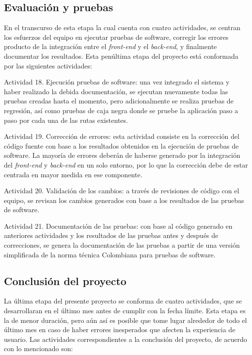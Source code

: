 \subsection{Evaluación y pruebas}
En el transcurso de esta etapa la cual cuenta con cuatro actividades, se centran los esfuerzos del equipo en ejecutar pruebas de software, corregir los errores producto de la integración entre el \textit{front-end} y el \textit{back-end}, y finalmente documentar los resultados. Esta penúltima etapa del proyecto está conformada por las siguientes actividades:

\begin{APAitemize}
    \item Actividad 18. Ejecución pruebas de software: una vez integrado el sistema y haber realizado la debida documentación, se ejecutan nuevamente todas las pruebas creadas hasta el momento, pero adicionalmente se realiza pruebas de regresión, así como pruebas de caja negra donde se pruebe la aplicación paso a paso por cada una de las rutas existentes.
    \item Actividad 19. Corrección de errores: esta actividad consiste en la corrección del código fuente con base a los resultados obtenidos en la ejecución de pruebas de software. La mayoría de errores deberán de haberse generado por la integración del \textit{front-end} y \textit{back-end} en un solo entorno, por lo que la corrección debe de estar centrada en mayor medida en ese componente.
    \item Actividad 20. Validación de los cambios: a través de revisiones de código con el equipo, se revisan los cambios generados con base a los resultados de las pruebas de software. 
    \item Actividad 21. Documentación de las pruebas: con base al código generado en anteriores actividades y los resultados de las pruebas antes y después de correcciones, se genera la documentación de las pruebas a partir de una versión simplificada de la norma técnica Colombiana para pruebas de software.
\end{APAitemize}

\subsection{Conclusión del proyecto}
La última etapa del presente proyecto se conforma de cuatro actividades, que se desarrollaran en el último mes antes de cumplir con la fecha límite. Esta etapa es la de menor duración, pero aún así es posible que tome lugar alrededor de todo el último mes en caso de haber errores inesperados que afecten la experiencia de usuario. Las actividades correspondientes a la conclusión del proyecto, de acuerdo con lo mencionado son:

